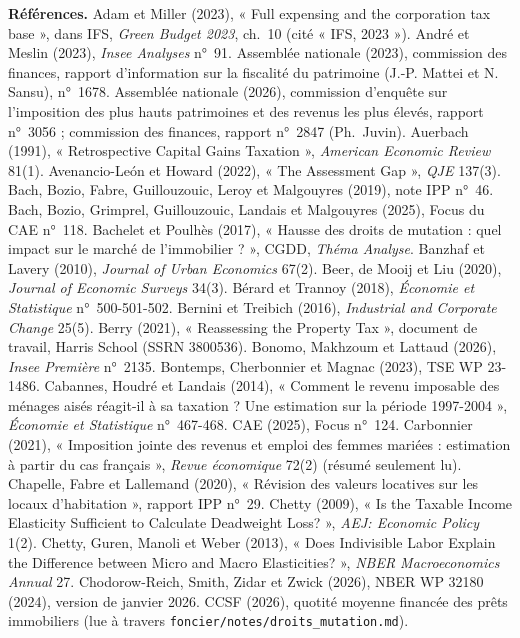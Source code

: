 \documentclass[11pt,a4paper]{article}
\begin{document}
\vspace{8pt}
{\scriptsize\setlength{\parskip}{2pt}\textbf{Références.}
Adam et Miller (2023), « Full expensing and the corporation tax base », dans IFS, \emph{Green Budget 2023}, ch.~10 (cité
« IFS, 2023 »).
André et Meslin (2023), \emph{Insee Analyses} n°~91.
Assemblée nationale (2023), commission des finances, rapport d'information sur la fiscalité du patrimoine (J.-P. Mattei et
N. Sansu), n°~1678.
Assemblée nationale (2026), commission d'enquête sur l'imposition des plus hauts patrimoines et des revenus les
plus élevés, rapport n°~3056 ; commission des finances, rapport n°~2847 (Ph.~Juvin).
Auerbach (1991), « Retrospective Capital Gains Taxation », \emph{American Economic Review} 81(1).
Avenancio-León et Howard (2022), « The Assessment Gap », \emph{QJE} 137(3).
Bach, Bozio, Fabre, Guillouzouic, Leroy et Malgouyres (2019), note IPP n°~46.
Bach, Bozio, Grimprel, Guillouzouic, Landais et Malgouyres (2025), Focus du CAE n°~118.
Bachelet et Poulhès (2017), « Hausse des droits de mutation : quel impact sur le marché de l'immobilier ? »,
CGDD, \emph{Théma Analyse}.
Banzhaf et Lavery (2010), \emph{Journal of Urban Economics} 67(2).
Beer, de Mooij et Liu (2020), \emph{Journal of Economic Surveys} 34(3).
Bérard et Trannoy (2018), \emph{Économie et Statistique} n°~500-501-502.
Bernini et Treibich (2016), \emph{Industrial and Corporate Change} 25(5).
Berry (2021), « Reassessing the Property Tax », document de travail, Harris School (SSRN 3800536).
Bonomo, Makhzoum et Lattaud (2026), \emph{Insee Première} n°~2135.
Bontemps, Cherbonnier et Magnac (2023), TSE WP 23-1486.
Cabannes, Houdré et Landais (2014), « Comment le revenu imposable des ménages aisés réagit-il à sa taxation ? Une
estimation sur la période 1997-2004 », \emph{Économie et Statistique} n°~467-468.
CAE (2025), Focus n°~124.
Carbonnier (2021), « Imposition jointe des revenus et emploi des femmes mariées : estimation à partir du cas
français », \emph{Revue économique} 72(2) (résumé seulement lu).
Chapelle, Fabre et Lallemand (2020), « Révision des valeurs locatives sur les locaux d'habitation », rapport IPP n°~29.
Chetty (2009), « Is the Taxable Income Elasticity Sufficient to Calculate Deadweight Loss? », \emph{AEJ:
Economic Policy} 1(2).
Chetty, Guren, Manoli et Weber (2013), « Does Indivisible Labor Explain the Difference between Micro and Macro
Elasticities? », \emph{NBER Macroeconomics Annual} 27.
Chodorow-Reich, Smith, Zidar et Zwick (2026), NBER WP 32180 (2024), version de janvier 2026.
CCSF (2026), quotité moyenne financée des prêts immobiliers (lue à travers \texttt{foncier/notes/droits\_mutation.md}).
}
\end{document}
